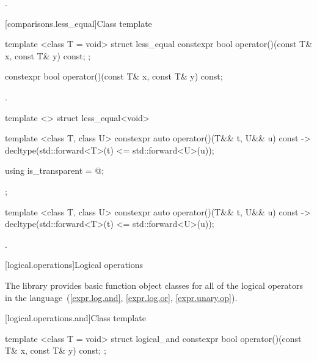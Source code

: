 \begin{itemdescr}
\pnum\returns {}.
\end{itemdescr}

[comparisons.less_equal]{Class template }

%
\begin{itemdecl}
template <class T = void> struct less_equal {
  constexpr bool operator()(const T& x, const T& y) const;
};
\end{itemdecl}

%
\begin{itemdecl}
constexpr bool operator()(const T& x, const T& y) const;
\end{itemdecl}

\begin{itemdescr}
\pnum\returns {}.
\end{itemdescr}

%
\begin{itemdecl}
template <> struct less_equal<void> {
  template <class T, class U> constexpr auto operator()(T&& t, U&& u) const
    -> decltype(std::forward<T>(t) <= std::forward<U>(u));

  using is_transparent = @\unspec@;
};
\end{itemdecl}

%
\begin{itemdecl}
template <class T, class U> constexpr auto operator()(T&& t, U&& u) const
    -> decltype(std::forward<T>(t) <= std::forward<U>(u));
\end{itemdecl}

\begin{itemdescr}
\pnum\returns {}.
\end{itemdescr}


[logical.operations]{Logical operations}

\pnum
The library provides basic function object classes for all of the logical
operators in the language~(\ref{expr.log.and}, \ref{expr.log.or}, \ref{expr.unary.op}).

[logical.operations.and]{Class template }

%
\begin{itemdecl}
template <class T = void> struct logical_and {
  constexpr bool operator()(const T& x, const T& y) const;
};
\end{itemdecl}


